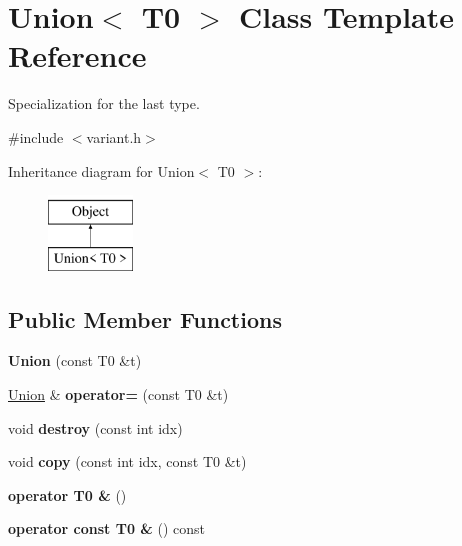 \hypertarget{classUnion_3_01T0_01_4}{}\section{Union$<$ T0 $>$ Class Template Reference}
\label{classUnion_3_01T0_01_4}


Specialization for the last type.  




{\ttfamily \#include $<$variant.\+h$>$}

Inheritance diagram for Union$<$ T0 $>$\+:\begin{figure}[H]
\begin{center}
\leavevmode
\includegraphics[height=2.000000cm]{classUnion_3_01T0_01_4}
\end{center}
\end{figure}
\subsection*{Public Member Functions}
\begin{DoxyCompactItemize}
\item 
\hypertarget{classUnion_3_01T0_01_4_ab6bd933a2ef451d176f9616546085b31}{}\label{classUnion_3_01T0_01_4_ab6bd933a2ef451d176f9616546085b31} 
{\bfseries Union} (const T0 \&t)
\item 
\hypertarget{classUnion_3_01T0_01_4_a14cabe1bbed2eab1c08b4697c4cee3e7}{}\label{classUnion_3_01T0_01_4_a14cabe1bbed2eab1c08b4697c4cee3e7} 
\hyperlink{classUnion}{Union} \& {\bfseries operator=} (const T0 \&t)
\item 
\hypertarget{classUnion_3_01T0_01_4_a866243a0cb104f3d8bbf14b95363325a}{}\label{classUnion_3_01T0_01_4_a866243a0cb104f3d8bbf14b95363325a} 
void {\bfseries destroy} (const int idx)
\item 
\hypertarget{classUnion_3_01T0_01_4_a8ef36c6787e0263f7c26808cf69b09a3}{}\label{classUnion_3_01T0_01_4_a8ef36c6787e0263f7c26808cf69b09a3} 
void {\bfseries copy} (const int idx, const T0 \&t)
\item 
\hypertarget{classUnion_3_01T0_01_4_a9af43cadc8e5bc7f8a843fe1bfa9a07d}{}\label{classUnion_3_01T0_01_4_a9af43cadc8e5bc7f8a843fe1bfa9a07d} 
{\bfseries operator T0 \&} ()
\item 
\hypertarget{classUnion_3_01T0_01_4_ae3e5fbd8fd63fbd8ca6063e15fb14af4}{}\label{classUnion_3_01T0_01_4_ae3e5fbd8fd63fbd8ca6063e15fb14af4} 
{\bfseries operator const T0 \&} () const
\end{DoxyCompactItemize}


